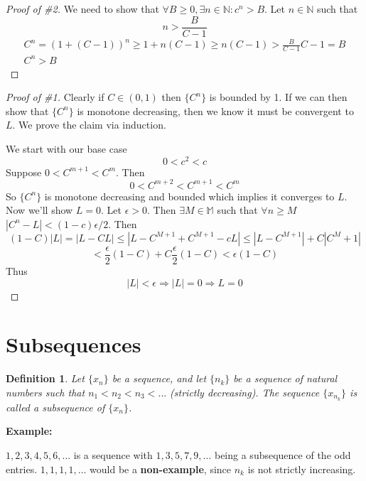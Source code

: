 \documentclass[12pt]{article}
\newtheorem{definition}{Definition}
\begin{document}
\begin{proof}[Proof of \#2]
    We need to show that \(\forall B \geq 0, \exists n \in \mathbb N : c^n > B\).
    Let \(n \in \mathbb N\) such that \[n > \frac{B}{C-1}\]
    \begin{gather*}
        C^n = (1 + (C-1))^n \geq 1 + n(C-1) \geq n(C-1) > \frac{B}{C-1}C-1 = B\\ 
        C^n > B
    \end{gather*}
\end{proof}
\begin{proof}[Proof of \#1]
    Clearly if \(C \in (0,1)\) then \(\{C^n\}\) is bounded by 1. 
    If we can then show that \(\{C^n\}\) is monotone decreasing, then we know 
    it must be convergent to \(L\).
    We prove the claim via induction. 

    \noindent 
    We start with our base case
    \[ 
        0 < c^2 < c
    \]
    Suppose \(0 < C^{m+1} < C^m\). 
    Then 
    \[
        0 < C^{m+2} < C^{m+1} < C^m
    \]
    So \(\{C^n\}\) is monotone decreasing and bounded which implies it converges to \(L\).
    Now we'll show \(L=0\).
    Let \(\epsilon > 0\). Then \(\exists M \in \mathbb M\) such that \(\forall n \geq M\)
    \(|C^n - L| < (1 - c) \epsilon/2\). 
    Then  
    \[ 
        (1-C)|L| = |L - CL| \leq |L - C^{M+1} + C^{M+1} - cL| \leq |L - C^{M+1}| + 
        C|C^M + 1|
    \]
    \[ 
        < \frac{\epsilon}{2}(1-C) + C\frac{\epsilon}{2}(1-C) < \epsilon(1-C)
    \]
    Thus 
    \[ 
        |L| < \epsilon \Rightarrow |L| = 0 \Rightarrow L = 0
    \]
    
\end{proof}

\section*{Subsequences}
\begin{definition}
    Let \(\{x_n\}\) be a sequence, and let \(\{n_k\}\) be a sequence of natural numbers 
    such that \(n_1 < n_2 < n_3 < \dots\) (strictly decreasing).
    The sequence \(\{x_{n_k}\}\) is called a subsequence of \(\{x_n\}\).
        
    
\end{definition}

\noindent 
\textbf{Example:}

\noindent 
\(1,2,3,4,5,6,\dots\) is a sequence with 
\(1,3,5,7,9,\dots\) being a subsequence of the odd entries.
\(1,1,1,1,\dots\) would be a \textbf{non-example}, since \(n_k\) 
is not strictly increasing.
\end{document}
